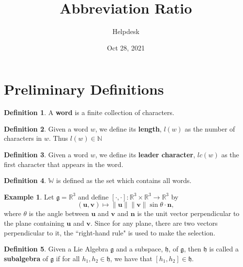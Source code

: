 \documentclass[12pt]{article}
\theoremstyle{definition}
\newtheorem{definition}{Definition}[section]
\theoremstyle{definition}
\newtheorem{exmp}{Example}[section]
\newcommand{\norm}[1]{\| #1 \|}
\begin{document}
\title{Abbreviation Ratio}
\author{Helpdesk}
\date{Oct 28, 2021}
\maketitle
    \section{Preliminary Definitions}
        \begin{definition}
            A \textbf{word} is a finite collection of characters. 
        \end{definition}
        \begin{definition}
            Given a word $w$, we define its \textbf{length}, $l(w)$ as the number of characters in $w$. Thus $l(w)\in\mathbb{N}$
        \end{definition}
        \begin{definition}
            Given a word $w$, we define its \textbf{leader character}, $lc(w)$ as the first character that appears in the word. 
        \end{definition}
        \begin{definition}
            $\mathbb{W}$ is defined as the set which contains all words. 
        \end{definition}
        \begin{exmp}
            Let $\mathfrak{g}=\mathbb{R}^3$ and define $[\cdot,
            \cdot]:\mathbb{R}^3\times\mathbb{R}^3\to\mathbb{R}^3$ by
                \begin{equation*}
                    (\mathbf{u},
                    \mathbf{v})\mapsto\norm{\mathbf{u}}\norm{\mathbf{v}}\sin\theta\cdot\mathbf{n},
                \end{equation*}
            where $\theta$ is the angle between $\mathbf{u}$ and $\mathbf{v}$
            and $\mathbf{n}$ is the unit vector perpendicular to the plane
            containing $\mathbf{u}$ and $\mathbf{v}$. Since for any plane,
            there are two vectors perpendicular to it, the ``right-hand rule"
            is used to make the selection. 
        \end{exmp}
        \begin{definition}
            Given a Lie Algebra $\mathfrak{g}$ and a subspace, $\mathfrak{h}$,
            of $\mathfrak{g}$, then $\mathfrak{h}$ is called
            a \textbf{subalgebra} of $\mathfrak{g}$ if for all $h_1,
            h_2\in\mathfrak{h}$, we have that $[h_1, h_2]\in\mathfrak{h}$.
        \end{definition}
\end{document}
